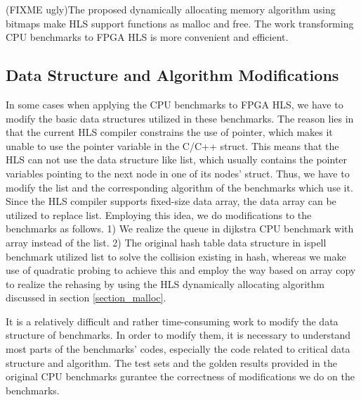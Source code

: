 \documentclass[conference]{IEEEtran}
\begin{document}
(FIXME ugly)The proposed dynamically allocating memory algorithm using bitmaps make HLS support functions as malloc and free. The work transforming CPU benchmarks to FPGA HLS is more convenient and efficient.
%
%
%
%
%

\subsection{Data Structure and Algorithm Modifications}
In some cases when applying the CPU benchmarks to FPGA HLS, we have to modify the basic data structures utilized in these benchmarks. The reason lies in that the current HLS compiler constrains the use of pointer, which makes it unable to use the pointer variable in the C/C++ struct. This means that the HLS can not use the data structure like list, which usually contains the pointer variables pointing to the next node in one of its nodes' struct. Thus, we have to modify the list and the corresponding algorithm of the benchmarks which use it. Since the HLS compiler supports fixed-size data array, the data array can be utilized to replace list. Employing this idea, we do modifications to the benchmarks as follows.
1) We realize the queue in dijkstra CPU benchmark with array instead of the list.
2) The original hash table data structure in ispell benchmark utilized list to solve the collision existing in hash, whereas we make use of quadratic probing to achieve this and employ the way based on array copy to realize the rehasing by using the HLS dynamically allocating algorithm discussed in section \ref{section_malloc}.

It is a relatively difficult and rather time-consuming work to modify the data structure of benchmarks. In order to modify them, it is necessary to understand most parts of the benchmarks' codes, especially the code related to critical data structure and algorithm. The test sets and the golden results provided in the original CPU benchmarks gurantee the correctness of modifications we do on the benchmarks.
\end{document}
